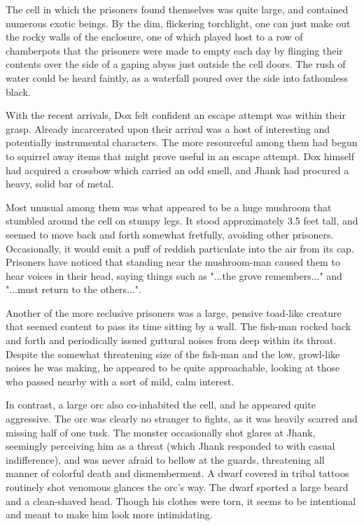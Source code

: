 \documentclass[letterpaper,10pt,twoside,twocolumn,openany]{book}
\begin{document}
The cell in which the prisoners found themselves was quite large, and contained numerous exotic beings. By the dim, flickering torchlight, one can just make out the rocky walls of the enclosure, one of which played host to a row of chamberpots that the prisoners were made to empty each day by flinging their contents over the side of a gaping abyss just outside the cell doors. The rush of water could be heard faintly, as a waterfall poured over the side into fathomless black.

With the recent arrivals, Dox felt confident an escape attempt was within their grasp. Already incarcerated upon their arrival was a host of interesting and potentially instrumental characters. The more resourceful among them had begun to squirrel away items that might prove useful in an escape attempt. Dox himself had acquired a crossbow which carried an odd smell, and Jhank had procured a heavy, solid bar of metal.

Most unusual among them was what appeared to be a huge mushroom that stumbled around the cell on stumpy legs. It stood approximately 3.5 feet tall, and seemed to move back and forth somewhat fretfully, avoiding other prisoners. Occasionally, it would emit a puff of reddish particulate into the air from its cap. Prisoners have noticed that standing near the mushroom-man caused them to hear voices in their head, saying things such as "...the grove remembers..." and "...must return to the others...".

Another of the more reclusive prisoners was a large, pensive toad-like creature that seemed content to pass its time sitting by a wall. The fish-man rocked back and forth and periodically issued guttural noises from deep within its throat. Despite the somewhat threatening size of the fish-man and the low, growl-like noises he was making, he appeared to be quite approachable, looking at those who passed nearby with a sort of mild, calm interest.

In contrast, a large orc also co-inhabited the cell, and he appeared quite aggressive. The orc was clearly no stranger to fights, as it was heavily scarred and missing half of one tusk. The monster occasionally shot glares at Jhank, seemingly perceiving him as a threat (which Jhank responded to with casual indifference), and was never afraid to bellow at the guards, threatening all manner of colorful death and dismemberment. A dwarf covered in tribal tattoos routinely shot venomous glances the orc's way. The dwarf sported a large beard and a clean-shaved head. Though his clothes were torn, it seems to be intentional and meant to make him look more intimidating.
\end{document}
